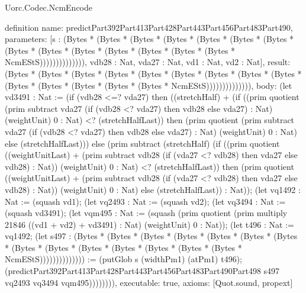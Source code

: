 \begin{lexlean}{Uorc.Codec.NcmEncode}
\begin{semanticmodule}
definition{
  name: predictPart392Part413Part428Part443Part456Part483Part490,
  parameters: [s : (Bytes * (Bytes * (Bytes * (Bytes * (Bytes * (Bytes * (Bytes * (Bytes * (Bytes * (Bytes * (Bytes * (Bytes * (Bytes * (Bytes * NcmEStS)))))))))))))), vdb28 : Nat, vda27 : Nat, vd1 : Nat, vd2 : Nat],
  result: (Bytes * (Bytes * (Bytes * (Bytes * (Bytes * (Bytes * (Bytes * (Bytes * (Bytes * (Bytes * (Bytes * (Bytes * (Bytes * (Bytes * NcmEStS)))))))))))))),
  body: (let vd3491 : Nat := (if (vdb28 <=? vda27) then ((stretchHalf) + (if ((prim quotient (prim subtract vda27 (if (vdb28 <? vda27) then vdb28 else vda27) : Nat) (weightUnit) 0 : Nat) <? (stretchHalfLast)) then (prim quotient (prim subtract vda27 (if (vdb28 <? vda27) then vdb28 else vda27) : Nat) (weightUnit) 0 : Nat) else (stretchHalfLast))) else (prim subtract (stretchHalf) (if ((prim quotient ((weightUnitLast) + (prim subtract vdb28 (if (vda27 <? vdb28) then vda27 else vdb28) : Nat)) (weightUnit) 0 : Nat) <? (stretchHalfLast)) then (prim quotient ((weightUnitLast) + (prim subtract vdb28 (if (vda27 <? vdb28) then vda27 else vdb28) : Nat)) (weightUnit) 0 : Nat) else (stretchHalfLast)) : Nat)); (let vq1492 : Nat := (squash vd1); (let vq2493 : Nat := (squash vd2); (let vq3494 : Nat := (squash vd3491); (let vqm495 : Nat := (squash (prim quotient (prim multiply 21846 ((vd1 + vd2) + vd3491) : Nat) (weightUnit) 0 : Nat)); (let t496 : Nat := vq1492; (let s497 : (Bytes * (Bytes * (Bytes * (Bytes * (Bytes * (Bytes * (Bytes * (Bytes * (Bytes * (Bytes * (Bytes * (Bytes * (Bytes * (Bytes * NcmEStS)))))))))))))) := (putGlob s (widthPm1) (atPm1) t496); (predictPart392Part413Part428Part443Part456Part483Part490Part498 s497 vq2493 vq3494 vqm495)))))))),
  executable: true,
  axioms: [Quot.sound, propext]
}


\end{semanticmodule}
\end{lexlean}

